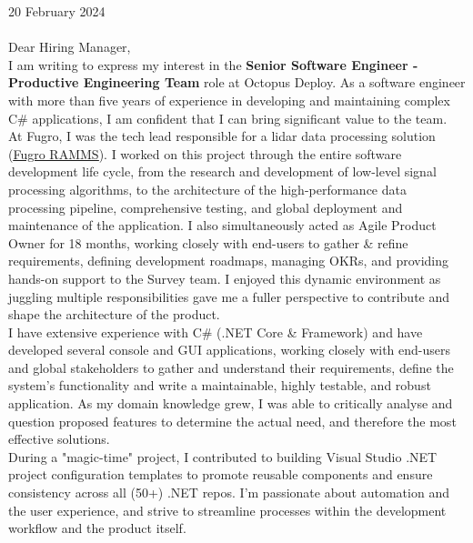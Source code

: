 \vspace{30pt}

20 February 2024 \\ \\

Dear Hiring Manager, \\

I am writing to express my interest in the \textbf{Senior Software Engineer - Productive Engineering Team} role at Octopus Deploy. As a software engineer with more than five years of experience in developing and maintaining complex C\# applications, I am confident that I can bring significant value to the team. \\

At Fugro, I was the tech lead responsible for a lidar data processing solution (\href{https://www.youtube.com/watch?v=f65bdm4tous}{\underline{Fugro RAMMS}}). I worked on this project through the entire software development life cycle, from the research and development of low-level signal processing algorithms, to the architecture of the high-performance data processing pipeline, comprehensive testing, and global deployment and maintenance of the application. I also simultaneously acted as Agile Product Owner for 18 months, working closely with end-users to gather \& refine requirements, defining development roadmaps, managing OKRs, and providing hands-on support to the Survey team. I enjoyed this dynamic environment as juggling multiple responsibilities gave me a fuller perspective to contribute and shape the architecture of the product. \\

I have extensive experience with C\# (.NET Core \& Framework) and have developed several console and GUI applications, working closely with end-users and global stakeholders to gather and understand their requirements, define the system's functionality and write a maintainable, highly testable, and robust application. As my domain knowledge grew, I was able to critically analyse and question proposed features to determine the actual need, and therefore the most effective solutions. \\

During a "magic-time" project, I contributed to building Visual Studio .NET project configuration templates to promote reusable components and ensure consistency across all (50+) .NET repos. I'm passionate about automation and the user experience, and strive to streamline processes within the development workflow and the product itself. \\


